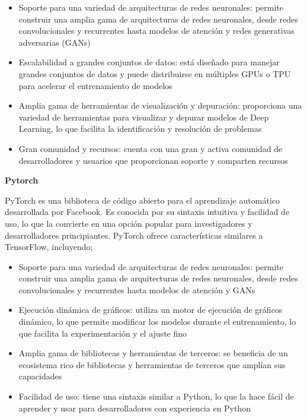 \documentclass[
  a4paper,
  DIV=11,
  numbers=noendperiod]{scrreprt}
\providecommand{\tightlist}{%
  \setlength{\itemsep}{0pt}\setlength{\parskip}{0pt}}\usepackage{longtable,booktabs,array}
\begin{document}
\begin{itemize}
\tightlist
\item
  Soporte para una variedad de arquitecturas de redes neuronales:
  permite construir una amplia gama de arquitecturas de redes
  neuronales, desde redes convolucionales y recurrentes hasta modelos de
  atención y redes generativas adversarias (GANs)
\item
  Escalabilidad a grandes conjuntos de datos: está diseñado para manejar
  grandes conjuntos de datos y puede distribuirse en múltiples GPUs o
  TPU para acelerar el entrenamiento de modelos
\item
  Amplia gama de herramientas de visualización y depuración: proporciona
  una variedad de herramientas para visualizar y depurar modelos de Deep
  Learning, lo que facilita la identificación y resolución de problemas
\item
  Gran comunidad y recursos: cuenta con una gran y activa comunidad de
  desarrolladores y usuarios que proporcionan soporte y comparten
  recursos
\end{itemize}

\textbf{Pytorch}

PyTorch es una biblioteca de código abierto para el aprendizaje
automático desarrollada por Facebook. Es conocida por su sintaxis
intuitiva y facilidad de uso, lo que la convierte en una opción popular
para investigadores y desarrolladores principiantes. PyTorch ofrece
características similares a TensorFlow, incluyendo:

\begin{itemize}
\tightlist
\item
  Soporte para una variedad de arquitecturas de redes neuronales:
  permite construir una amplia gama de arquitecturas de redes
  neuronales, desde redes convolucionales y recurrentes hasta modelos de
  atención y GANs
\item
  Ejecución dinámica de gráficos: utiliza un motor de ejecución de
  gráficos dinámico, lo que permite modificar los modelos durante el
  entrenamiento, lo que facilita la experimentación y el ajuste fino
\item
  Amplia gama de bibliotecas y herramientas de terceros: se beneficia de
  un ecosistema rico de bibliotecas y herramientas de terceros que
  amplían sus capacidades
\item
  Facilidad de uso: tiene una sintaxis similar a Python, lo que la hace
  fácil de aprender y usar para desarrolladores con experiencia en
  Python
\end{itemize}
\end{document}
